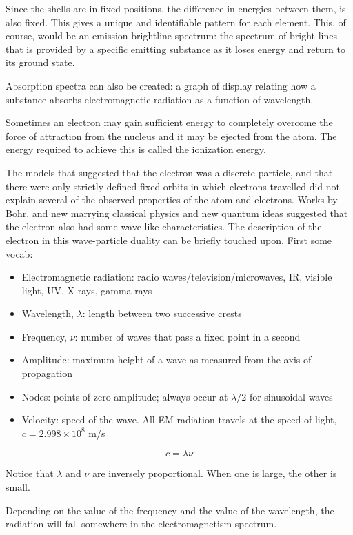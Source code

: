 \documentclass[../chem.tex]{subfiles}
\begin{document}
Since the shells are in fixed positions, the difference in energies between them, is also fixed. This gives a unique and identifiable pattern for each element.
This, of course, would be an emission brightline spectrum: the spectrum of bright lines that is provided by a specific emitting substance as it loses energy and return to its ground state.

Absorption spectra can also be created: a graph of display relating how a substance absorbs electromagnetic radiation as a function of wavelength.

Sometimes an electron may gain sufficient energy to completely overcome the force of attraction from the nucleus and it may be ejected from the atom.
The energy required to achieve this is called the ionization energy. 

The models that suggested that the electron was a discrete particle, and that there were only strictly defined fixed orbits in which electrons travelled did not explain several of the observed properties of the atom and electrons.
Works by Bohr, and new marrying classical physics and new quantum ideas suggested that the electron also had some wave-like characteristics. The description of the electron in this wave-particle duality can be briefly touched upon.
First some vocab:
\begin{itemize}
    \item Electromagnetic radiation: radio waves/television/microwaves, IR, visible light, UV, X-rays, gamma rays
    \item Wavelength, $\lambda$: length between two successive crests 
    \item Frequency, $\nu$: number of waves that pass a fixed point in a second
    \item Amplitude: maximum height of a wave as measured from the axis of propagation
    \item Nodes: points of zero amplitude; always occur at $\lambda/2$ for sinusoidal waves
    \item Velocity: speed of the wave. All EM radiation travels at the speed of light, $c=2.998\times10^8$ m/s
\end{itemize}
\[c=\lambda \nu\]

Notice that $\lambda$ and $\nu$ are inversely proportional. When one is large, the other is small.

Depending on the value of the frequency and the value of the wavelength, the radiation will fall somewhere in the electromagnetism spectrum.
\end{document}
